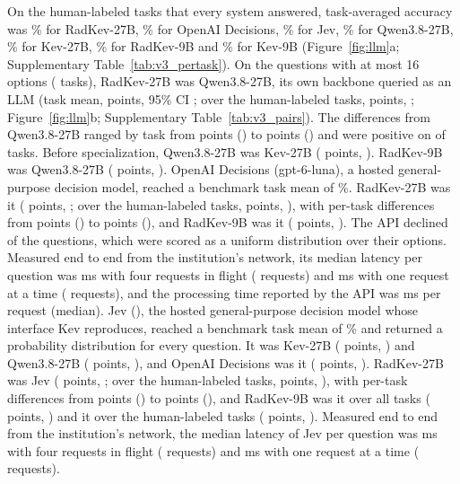 On the  human-labeled tasks that every system answered, task-averaged accuracy was \% for RadKev-27B, \% for OpenAI Decisions, \% for Jev, \% for Qwen3.8-27B, \% for Kev-27B, \% for RadKev-9B and \% for Kev-9B (Figure~\ref{fig:llm}a; Supplementary Table~\ref{tab:v3_pertask}). %
On the questions with at most 16 options ( tasks), RadKev-27B was  Qwen3.8-27B, its own backbone queried as an LLM (task mean,  points, 95\% CI ; over the  human-labeled tasks,  points, ; Figure~\ref{fig:llm}b; Supplementary Table~\ref{tab:v3_pairs}). %
The differences from Qwen3.8-27B ranged by task from  points () to  points () and were positive on  of  tasks. %
Before specialization, Qwen3.8-27B was  Kev-27B ( points, ). %
RadKev-9B was  Qwen3.8-27B ( points, ).
OpenAI Decisions (gpt-6-luna), a hosted general-purpose decision model, reached a benchmark task mean of \%. RadKev-27B was  it ( points, ; over the human-labeled tasks,  points, ), with per-task differences from  points () to  points (), and RadKev-9B was  it ( points, ). The API declined  of the  questions, which were scored as a uniform distribution over their options. Measured end to end from the institution's network, its median latency per question was  ms with four requests in flight ( requests) and  ms with one request at a time ( requests), and the processing time reported by the API was  ms per request (median). %
Jev (), the hosted general-purpose decision model whose interface Kev reproduces, reached a benchmark task mean of \% and returned a probability distribution for every question. It was  Kev-27B ( points, ) and  Qwen3.8-27B ( points, ), and OpenAI Decisions was  it ( points, ). RadKev-27B was  Jev ( points, ; over the human-labeled tasks,  points, ), with per-task differences from  points () to  points (), and RadKev-9B was  it over all tasks ( points, ) and  it over the human-labeled tasks ( points, ). Measured end to end from the institution's network, the median latency of Jev per question was  ms with four requests in flight ( requests) and  ms with one request at a time ( requests). %
